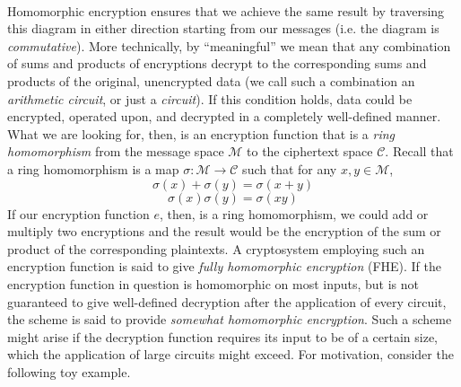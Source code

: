 \documentclass[11pt]{report}
\newcommand{\M}{\mathcal{M}}
\begin{document}
\

Homomorphic encryption ensures that we achieve the same result by traversing this diagram in either direction starting from our messages (i.e. the diagram is \emph{commutative}). More technically, by ``meaningful'' we mean that any combination of sums and products of encryptions decrypt to the corresponding sums and products of the original, unencrypted data (we call such a combination an \emph{arithmetic circuit}, or just a \emph{circuit}). If this condition holds, data could be encrypted, operated upon, and decrypted in a completely well-defined manner. What we are looking for, then, is an encryption function that is a \emph{ring homomorphism} from the message space $\M$ to the ciphertext space $\mathcal{C}$. Recall that a ring homomorphism is a map $\sigma: \M \rightarrow \mathcal{C}$ such that for any $x,y\in \M$, \[\sigma(x)+\sigma(y) = \sigma(x+y)\] \[\sigma(x) \sigma(y) = \sigma(xy)\] If our encryption function $e$, then, is a ring homomorphism, we could add or multiply two encryptions and the result would be the encryption of the sum or product of the corresponding plaintexts. A cryptosystem employing such an encryption function is said to give \emph{fully homomorphic encryption} (FHE). If the encryption function in question is homomorphic on most inputs, but is not guaranteed to give well-defined decryption after the application of every circuit, the scheme is said to provide \emph{somewhat homomorphic encryption}. Such a scheme might arise if the decryption function requires its input to be of a certain size, which the application of large circuits might exceed. For motivation, consider the following toy example.
\end{document}
